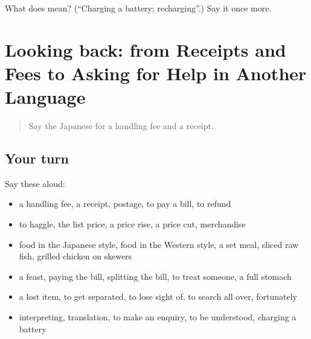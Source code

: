 \begin{tcolorbox}[breakable,colback=teal!4,colframe=teal!35!black,title={Before you move on}]
What does  mean? (\textquotedblleft{}Charging a battery; recharging\textquotedblright{}.) Say it once more.
\end{tcolorbox}
\section[(dialogue)]{Looking back: from Receipts and Fees to Asking for Help in Another Language}

\label{lesson:JA-R425-review-420-425}



\begin{quote}
Say the Japanese for a handling fee and a receipt.
\end{quote}

\subsection*{Your turn}
Say these aloud:

\begin{itemize}
\raggedright
  \item a handling fee, a receipt, postage, to pay a bill, to refund
  \item to haggle, the list price, a price rise, a price cut, merchandise
  \item food in the Japanese style, food in the Western style, a set meal, sliced raw fish, grilled chicken on skewers
  \item a feast, paying the bill, splitting the bill, to treat someone, a full stomach
  \item a lost item, to get separated, to lose sight of, to search all over, fortunately
  \item interpreting, translation, to make an enquiry, to be understood, charging a battery
\end{itemize}

